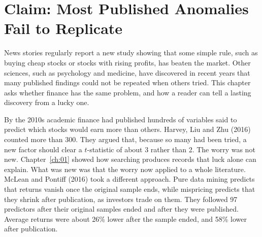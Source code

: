 \makeatletter
{}
\makeatother

\makeatletter
\makeatother

\chapter{Claim: Most Published Anomalies Fail to Replicate}
\label{ch:15}

News stories regularly report a new study showing that some simple rule, such as buying cheap stocks or stocks with rising profits, has beaten the market. Other sciences, such as psychology and medicine, have discovered in recent years that many published findings could not be repeated when others tried. This chapter asks whether finance has the same problem, and how a reader can tell a lasting discovery from a lucky one.

By the 2010s academic finance had published hundreds of variables said to predict which stocks would earn more than others. Harvey, Liu and Zhu (2016) counted more than 300. They argued that, because so many had been tried, a new factor should clear a $t$-statistic of about 3 rather than 2. The worry was not new. Chapter~\ref{ch:01} showed how searching produces records that luck alone can explain. What was new was that the worry now applied to a whole literature. McLean and Pontiff (2016) took a different approach. Pure data mining predicts that returns vanish once the original sample ends, while mispricing predicts that they shrink after publication, as investors trade on them. They followed 97 predictors after their original samples ended and after they were published. Average returns were about 26\% lower after the sample ended, and 58\% lower after publication.

